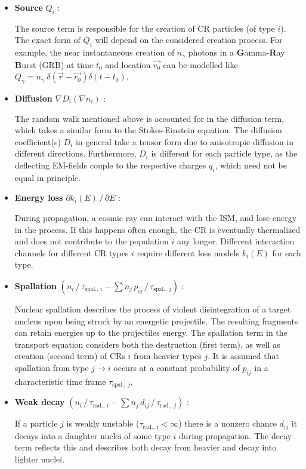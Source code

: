 \begin{itemize}
	\item \textbf{Source} $Q_i$ :

	The source term is responsible for the creation of CR particles (of type $i$). The exact form of $Q_i$ will depend on the considered creation process. For 
	example, the near instantaneous creation of $n_\gamma$ photons in a \textbf{G}amma-\textbf{R}ay \textbf{B}urst (GRB) at time $t_0$ and location $\vec{r_0}$ can 
	be modelled like $Q_\gamma = n_\gamma \; \delta(\vec{r} - \vec{r_0})\delta(t - t_0)$.

	\item \textbf{Diffusion} $\nabla D_i \left( \nabla n_i \right)$ :

	The random walk mentioned above is accounted for in the diffusion term, which takes a similar form to the Stokes-Einstein equation. The diffusion 
	coefficient(s) $D_i$ in general take a tensor form due to anisotropic diffusion in different directions. Furthermore, $D_i$ is different for each particle 
	type, as the deflecting EM-fields couple to the respective charges $q_i$, which need not be equal in principle.

	\item \textbf{Energy loss} $\partial k_i(E)\,/\,\partial E$ :

	During propagation, a cosmic ray can interact with the ISM, and lose energy in the process. If this happens often enough, the CR is eventually thermalized and 
	does not contribute to the population $i$ any longer. Different interaction channels for different CR types $i$ require different loss models $k_i(E)$ for each 
	type. 

	\item \textbf{Spallation} $\left( n_i\,/\,\tau_{\text{spal.},\,i} - \sum n_j\,p_{ij}\,/\,\tau_{\text{spal.},\,j} \right)$ :

	Nuclear spallation describes the process of violent disintegration of a target nucleus upon being struck by an energetic projectile. The resulting fragments
	can retain energies up to the projectiles energy. The spallation term in the transport equation considers both the destruction (first term), as well as 
	creation (second term) of CRs $i$ from heavier types $j$. It is assumed that spallation from type $j \rightarrow i$ occurs at a constant probability of 
	$p_{ij}$ in a characteristic time frame $\tau_{\text{spal.},\,j}$.

	\item \textbf{Weak decay} $\left( n_i\,/\,\tau_{\text{rad.},\,i} - \sum n_j\,d_{ij}\,/\,\tau_{\text{rad.},\,j} \right)$ :

	If a particle $j$ is weakly unstable ($\tau_{\text{rad.},\,i} < \infty$) there is a nonzero chance $d_{ij}$ it decays into a daughter nuclei of some type $i$ 
	during propagation. The decay term reflects this and describes both decay from heavier and decay into lighter nuclei.
\end{itemize}

